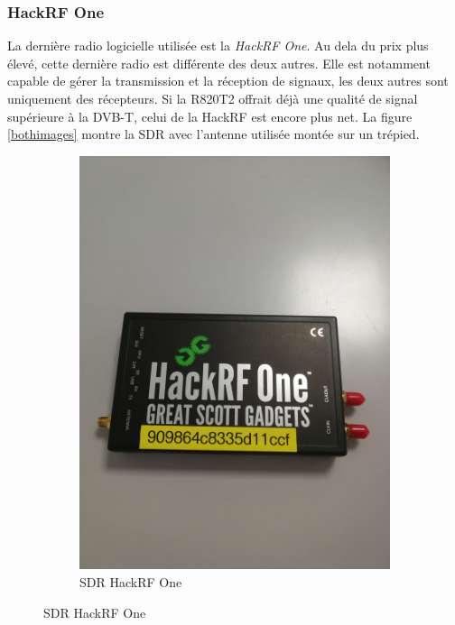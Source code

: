 \subsubsection{HackRF One}

La dernière radio logicielle utilisée est la \textit{HackRF One}. Au dela du prix plus élevé, cette dernière radio est différente des deux autres. Elle est notamment capable de gérer la transmission et la réception de signaux, les deux autres sont uniquement des récepteurs. Si la R820T2 offrait déjà une qualité de signal supérieure à la \ac{DVB-T}, celui de la HackRF est encore plus net. La figure \ref{bothimages} montre la \ac{SDR} avec l'antenne utilisée montée sur un trépied.

\begin{figure}[h]
\centering
\begin{subfigure}{0.4\textwidth}
  \centering
  \includegraphics[width=\textwidth]{images/hackrf.png}
  \caption{SDR HackRF One}
  \label{term330}

\end{subfigure}
\end{figure}
